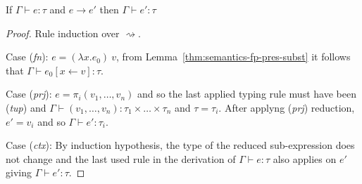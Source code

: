 \begin{theorem}
\label{thm:semantics-fp-pres}
  If $\Gamma \vdash e : \tau$ and $e \rightarrow e'$ then $\Gamma \vdash e' : \tau$
\end{theorem}
\begin{proof}
  Rule induction over $\rightsquigarrow$.

\vspace{0.25em}\noindent\hangindent=0.6cm
Case (\emph{fn}): $e = (\lambda x.e_0)~v$, from Lemma~\ref{thm:semantics-fp-pres-subst}
  it follows that $\Gamma \vdash e_0[x \leftarrow v] : \tau$.

\vspace{0.25em}\noindent\hangindent=0.6cm
Case (\emph{prj}): $e = \pi_i(v_1, \ldots, v_n)$ and so the last applied typing rule must have been
  (\emph{tup}) and $\Gamma \vdash (v_1, \ldots, v_n) : \tau_1 \times\ldots\times \tau_n$ and
  $\tau = \tau_i$. After applyng (\emph{prj}) reduction, $e' = v_i$ and so $\Gamma \vdash e' : \tau_i$.

\vspace{0.25em}\noindent\hangindent=0.6cm
Case (\emph{ctx}): By induction hypothesis, the type of the reduced sub-expression does not change
  and the last used rule in the derivation of $\Gamma \vdash e : \tau$ also applies on $e'$
  giving $\Gamma \vdash e' : \tau$.
\end{proof}

